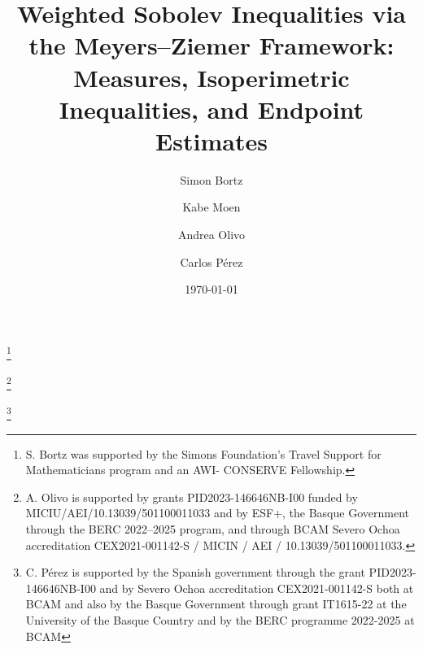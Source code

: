 \documentclass[11pt, a4paper, reqno]{amsart}
\theoremstyle{definition}
\theoremstyle{remark}
\begin{document}






\title[Weighted Sobolev Inequalities]{Weighted Sobolev Inequalities via the Meyers--Ziemer Framework:
Measures, Isoperimetric Inequalities, and Endpoint Estimates}
\date{\today}
\author{Simon Bortz}

\address{Simon Bortz \\
 Department of Mathematics \\
 University of Alabama \\
 Tuscaloosa, AL 35487, USA}
\thanks{S. Bortz was supported by the Simons Foundation’s Travel Support for Mathematicians program and an AWI-
CONSERVE Fellowship.}



\author{Kabe Moen}

\address{Kabe Moen \\
 Department of Mathematics \\
 University of Alabama \\
 Tuscaloosa, AL 35487, USA}


\author{Andrea Olivo}

\address{Andrea Olivo\\
 Department of Mathematics \\
 Facultad de Ciencias Exactas y Naturales, Universidad de Buenos Aires and IMAS-CONICET\\
 Pabell\'on I (C1428EGA), Ciudad de Buenos Aires,
Argentina}
 \thanks{A. Olivo is supported by grants PID2023-146646NB-I00 funded by MICIU/AEI/10.13039/501100011033 and by ESF+, the Basque Government through the BERC 2022–2025 program, and through BCAM Severo Ochoa accreditation CEX2021-001142-S / MICIN / AEI / 10.13039/501100011033.}

\author{Carlos P\'erez }

\address{Carlos P\'erez\\
 Department of Mathematics \\
 University of the Basque Country \\
 Ikerbasque and BCAM \\
 Bilbao, Spain}
\thanks{C. P\'erez is supported by the Spanish government through the grant PID2023-146646NB-I00 and by Severo Ochoa accreditation CEX2021-001142-S both at BCAM and also by the Basque Government through grant IT1615-22 at the University of the Basque Country and by the BERC programme 2022-2025 at BCAM}
\end{document}
